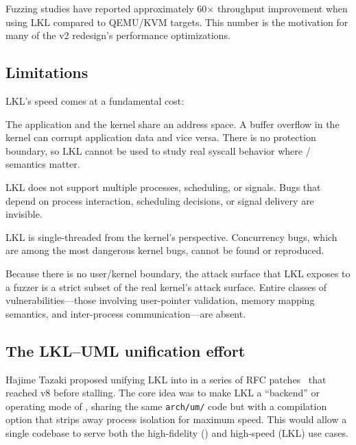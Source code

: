 Fuzzing studies have reported approximately 60$\times$ throughput
improvement when using \textsc{LKL} compared to QEMU/KVM targets.
This number is the motivation for many of the v2 redesign's
performance optimizations.

\subsection{Limitations}

\textsc{LKL}'s speed comes at a fundamental cost:

\begin{description}[style=nextline,leftmargin=2em]
  \item[No user/kernel separation.]
    The application and the kernel share an address space.  A buffer
    overflow in the kernel can corrupt application data and vice versa.
    There is no protection boundary, so \textsc{LKL} cannot be used to
    study real syscall behavior where  /
     semantics matter.

  \item[No process model.]
    \textsc{LKL} does not support multiple processes, scheduling, or
    signals.  Bugs that depend on process interaction, scheduling
    decisions, or signal delivery are invisible.

  \item[No SMP.]
    \textsc{LKL} is single-threaded from the kernel's perspective.
    Concurrency bugs, which are among the most dangerous kernel bugs,
    cannot be found or reproduced.

  \item[No realistic attack surface.]
    Because there is no user/kernel boundary, the attack surface that
    \textsc{LKL} exposes to a fuzzer is a strict subset of the real
    kernel's attack surface.  Entire classes of vulnerabilities---those
    involving user-pointer validation, memory mapping semantics, and
    inter-process communication---are absent.
\end{description}

\subsection{The LKL--UML unification effort}

Hajime Tazaki proposed unifying \textsc{LKL} into \UML{} in a series
of RFC patches~\cite{tazaki2019} that reached v8 before stalling.
The core idea was to make \textsc{LKL} a ``backend'' or operating
mode of \UML{}, sharing the same \texttt{arch/um/} code but with a
compilation option that strips away process isolation for maximum
speed.  This would allow a single codebase to serve both the
high-fidelity (\UML{}) and high-speed (\textsc{LKL}) use cases.


